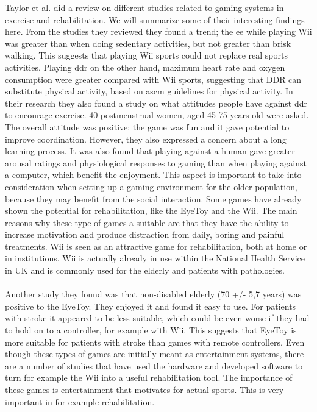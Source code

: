 Taylor et al. \cite{taylor2011activity} did a review on different studies related to gaming systems in exercise and rehabilitation. We will summarize some of their interesting findings here. From the studies they reviewed they found a trend; the  \ac{ee} while playing Wii was greater than when doing sedentary activities, but not greater than brisk walking. This suggests that playing Wii sports could not replace real sports activities. Playing \ac{ddr} on the other hand, maximum heart rate and oxygen consumption were greater compared with Wii sports, suggesting that DDR can substitute physical activity, based on \ac{ascm} guidelines for physical activity. In their research they also found a study on what attitudes people have against \ac{ddr} to encourage exercise. 40 postmenstrual women, aged 45-75 years old were asked. The overall attitude was positive; the game was fun and it gave potential to improve coordination. However, they also expressed a concern about a long learning process. It was also found that playing against a human gave greater arousal ratings and physiological responses to gaming than when playing against a computer, which benefit the enjoyment. This aspect is important to take into consideration when setting up a gaming environment for the older population, because they may benefit from the social interaction. Some games have already shown the potential for rehabilitation, like the EyeToy and the Wii. The main reasons why these type of games a suitable are that they have the ability to increase motivation and produce distraction from daily, boring and painful treatments. Wii is seen as an attractive game for rehabilitation, both at home or in institutions. Wii is actually already in use within the National Health Service in UK and is commonly used for the elderly and patients with pathologies.  \cite{taylor2011activity} \\ \\
Another study they found was that non-disabled  elderly (70 +/- 5,7 years) was positive to the EyeToy. They enjoyed it and found it easy to use. For patients with stroke it appeared to be less suitable, which could be even worse if they had to hold on to a controller, for example with Wii. This suggests that EyeToy is more suitable for patients with stroke than games with remote controllers.  
Even though these types of games are initially meant as entertainment systems, there are a number of studies that have used the hardware and developed software to turn for example the Wii into a useful rehabilitation tool. The importance of these games is entertainment that motivates for actual sports. This is very important in for example rehabilitation. \cite{taylor2011activity} \\ \\
